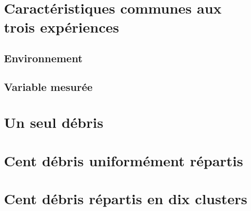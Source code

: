 \section{Caractéristiques communes aux trois expériences}
\subsection{Environnement}
\subsection{Variable mesurée}

\section{Un seul débris}



\section{Cent débris uniformément répartis}



\section{Cent débris répartis en dix clusters}

